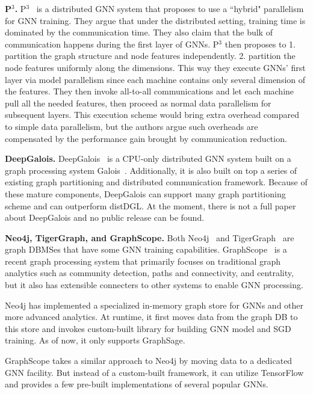 \vspace{2mm}
\noindent \textbf{P$^{3}$.} P$^{3}$~\cite{pcube} is a distributed GNN system that proposes to use a ``hybrid" parallelism for GNN training. They argue that under the distributed setting, training time is dominated by the communication time. They also claim that the bulk of communication happens during the first layer of GNNs. P$^{3}$ then proposes to 1. partition the graph structure and node features independently. 2. partition the node features uniformly along the dimensions. This way they execute GNNs' first layer via model parallelism since each machine contains only several dimension of the features. They then invoke all-to-all communications and let each machine pull all the needed features, then proceed as normal data parallelism for subsequent layers. This execution scheme would bring extra overhead compared to simple data parallelism, but the authors argue such overheads are compensated by the performance gain brought by communication reduction.



\vspace{2mm}
\noindent \textbf{DeepGalois.} 
DeepGalois~\cite{deepgalois} is a CPU-only distributed GNN system built on a graph processing system Galois~\cite{galois}. Additionally, it is also built on top a series of existing graph partitioning and distributed communication framework. Because of these mature components, DeepGalois can support many graph partitioning scheme and can outperform distDGL. At the moment, there is not a full paper about DeepGalois and no public release can be found.


\vspace{2mm}
\noindent \textbf{Neo4j, TigerGraph, and GraphScope.}
Both Neo4j~\cite{neo4j} and TigerGraph~\cite{tigergraph} are graph DBMSes that have some GNN training capabilities. GraphScope~\cite{graphscope} is a recent graph processing system that primarily focuses on traditional graph analytics such as community detection, paths and connectivity, and centrality, but it also has extensible connecters to other systems to enable GNN processing.

Neo4j has implemented a specialized in-memory graph store for GNNs and other more advanced analytics. At runtime, it first moves data from the graph DB to this store and invokes custom-built library for building GNN model and SGD training. As of now, it only supports GraphSage. 

GraphScope takes a similar approach to Neo4j by moving data to a dedicated GNN facility. But instead of a custom-built framework, it can utilize TensorFlow and provides a few pre-built implementations of several popular GNNs.

